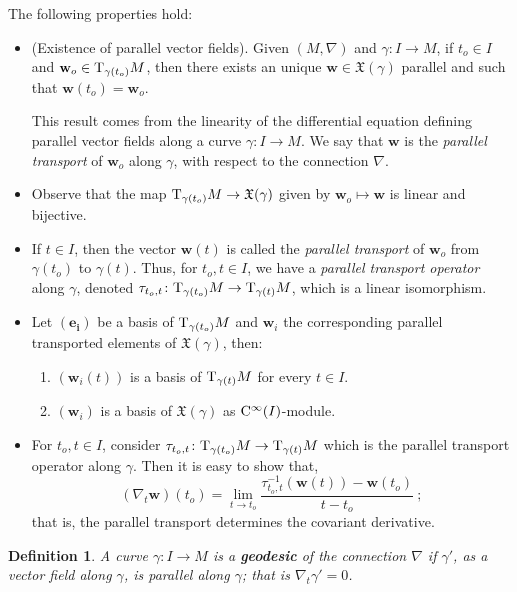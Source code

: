 \documentclass[12pt]{report}
\newtheorem{definition}[teor]{Definition}
\def\vf{\mathfrak X}
\def\Tan{{\rm T}}
\def\Cinfty{{\rm C}^\infty}
\begin{document}
The following properties hold:
\begin{itemize}
  \item
(Existence of parallel vector fields). Given $(M,\nabla)$ and 
$\gamma\colon I\to M$, if $t_o\in I$ and $\mathbf{w}_o\in\Tan _{\gamma(t_o)}M$, 
then there exists an unique $\mathbf{w}\in\vf(\gamma)$ parallel and such that $\mathbf{w}(t_o)=\mathbf{w}_o$.
  
This result comes from the linearity of the differential equation 
defining parallel vector fields along a curve $\gamma\colon I\to M$. 
We say that $\mathbf{w}$ is the {\sl parallel transport} of $\mathbf{w}_o$ 
along $\gamma$, with respect to the connection $\nabla$.
  \item 
Observe that the map $\Tan _{\gamma(t_o)}M\to\vf(\gamma)$ 
given by $\mathbf{w}_o\mapsto\mathbf{w}$ is linear and bijective.
\item
If $t\in I$, then the vector $\mathbf{w}(t)$ is called the {\sl parallel transport} of $\mathbf{w}_o$ from $\gamma(t_o)$ to $\gamma(t)$. 
Thus, for $t_o,t\in I$, we have a {\sl parallel transport operator} along $\gamma$, denoted $\tau_{t_o,t}\colon\Tan _{\gamma(t_o)}M\to \Tan _{\gamma(t)}M$, which is a linear isomorphism. 
  \item 
Let $(\mathbf{e_i})$ be a basis of $\Tan _{\gamma(t_o)}M$ 
and $\mathbf{w}_i$ the corresponding parallel transported elements 
of $\vf(\gamma)$, then:
 \begin{enumerate}
  \item 
$(\mathbf{w}_i(t))$ is a basis of $\Tan _{\gamma(t)}M$ for every $t\in I$.
  \item 
$(\mathbf{w}_i)$ is a basis of $\vf(\gamma)$ as $\Cinfty(I)$-module.
  \end{enumerate}
  \item 
For $t_o,t\in I$, consider $\tau_{t_o,t}\colon\Tan _{\gamma(t_o)}M\to \Tan _{\gamma(t)}M$ which is the parallel transport operator along $\gamma$. 
Then it is easy to show that,
  $$
  (\nabla_{t}\mathbf{w})(t_o)=\lim_{t\to t_o}\frac{\tau_{t_o,t}^{-1}(\mathbf{w}(t))-\mathbf{w}(t_o)}{t-t_o}\ ;
  $$
that is, the parallel transport determines the covariant derivative.
\end{itemize}

\begin{definition}
A curve $\gamma\colon I\to M$ is a \textbf{geodesic} of the connection $\nabla$
if $\gamma'$, as a vector field along $\gamma$, 
is parallel along $\gamma$; that is $\nabla_t{\gamma'}=0$. 
\end{definition}
\end{document}
